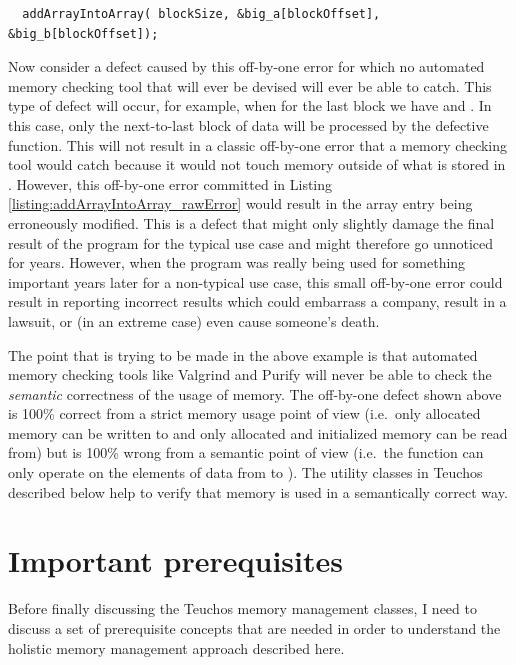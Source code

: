 \documentclass[pdf,ps2pdf,11pt]{SANDreport}
\begin{document}
{\small\begin{verbatim}
  addArrayIntoArray( blockSize, &big_a[blockOffset], &big_b[blockOffset]);
\end{verbatim}}

Now consider a defect caused by this off-by-one error for which no
automated memory checking tool that will ever be devised will ever be
able to catch.  This type of defect will occur, for example, when for
the last block {} we have
{} and
{}.  In this case, only
the next-to-last block of data will be processed by the defective
{} function.  This will not result in a
classic off-by-one error that a memory checking tool would catch
because it would not touch memory outside of what is stored in
{}.  However, this off-by-one error committed in Listing
{}\ref{listing:addArrayIntoArray_rawError} would result in the array
entry {} being
erroneously modified.  This is a defect that might only slightly
damage the final result of the program for the typical use case and
might therefore go unnoticed for years.  However, when the program was
really being used for something important years later for a
non-typical use case, this small off-by-one error could result in
reporting incorrect results which could embarrass a company, result in
a lawsuit, or (in an extreme case) even cause someone's death.

The point that is trying to be made in the above example is that
automated memory checking tools like Valgrind and Purify will never be
able to check the {}\textit{semantic} correctness of the usage of
memory.  The off-by-one defect shown above is 100\% correct from a
strict memory usage point of view (i.e.\ only allocated memory can be
written to and only allocated and initialized memory can be read from)
but is 100\% wrong from a semantic point of view (i.e.\ the function
{} can only operate on the elements of
data from {} to {}).  The utility classes in Teuchos
described below help to verify that memory is used in a semantically
correct way.


%
{}\section{Important prerequisites}
\label{sec:important-prerequisites}
%

Before finally discussing the Teuchos memory management classes, I
need to discuss a set of prerequisite concepts that are needed in
order to understand the holistic memory management approach described
here.
\end{document}

